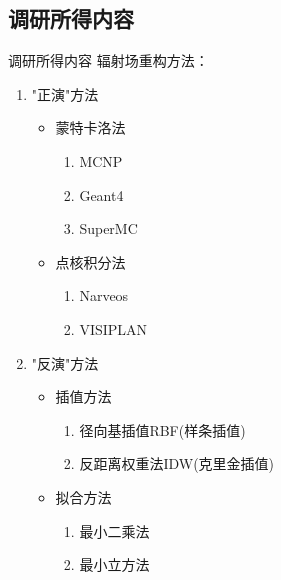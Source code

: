 \documentclass{beamer}
\begin{document}
\subsection{调研所得内容}
\begin{frame}{调研所得内容}
    辐射场重构方法：
    \begin{enumerate}
        \item "正演"方法
              \begin{itemize}
                  \item 蒙特卡洛法
                        \begin{enumerate}
                            \item MCNP
                            \item Geant4
                            \item SuperMC
                        \end{enumerate}
                  \item 点核积分法
                        \begin{enumerate}
                            \item Narveos
                            \item VISIPLAN
                        \end{enumerate}
              \end{itemize}
        \item "反演"方法
              \begin{itemize}
                  \item 插值方法
                        \begin{enumerate}
                            \item 径向基插值RBF(样条插值)
                            \item 反距离权重法IDW(克里金插值)
                        \end{enumerate}
                  \item 拟合方法
                        \begin{enumerate}
                            \item 最小二乘法
                            \item 最小立方法
                        \end{enumerate}
              \end{itemize}
    \end{enumerate}
\end{frame}
\end{document}

